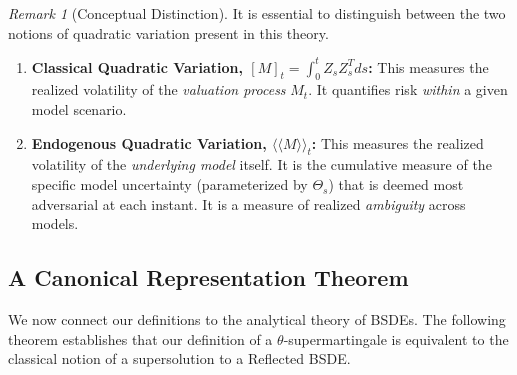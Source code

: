 \documentclass[12pt, letterpaper]{amsart}
\theoremstyle{plain}
\theoremstyle{definition}
\theoremstyle{remark}
\newtheorem{remark}[theorem]{Remark}
\numberwithin{equation}{section} %
\begin{document}
\begin{remark}[Conceptual Distinction]
\label{rem:qv_distinction}
It is essential to distinguish between the two notions of quadratic variation present in this theory.
\begin{enumerate}
    \item \textbf{Classical Quadratic Variation, \([M]_t = \int_0^t Z_s Z_s^T ds\):} This measures the realized volatility of the \emph{valuation process} \(M_t\). It quantifies risk \emph{within} a given model scenario.
    \item \textbf{Endogenous Quadratic Variation, \(\langle\langle M \rangle\rangle_t\):} This measures the realized volatility of the \emph{underlying model} itself. It is the cumulative measure of the specific model uncertainty (parameterized by \(\Theta_s\)) that is deemed most adversarial at each instant. It is a measure of realized \emph{ambiguity} across models.
\end{enumerate}
\end{remark}

\subsection{A Canonical Representation Theorem}
We now connect our definitions to the analytical theory of BSDEs. The following theorem establishes that our definition of a \(\theta\)-supermartingale is equivalent to the classical notion of a supersolution to a Reflected BSDE.
\end{document}
